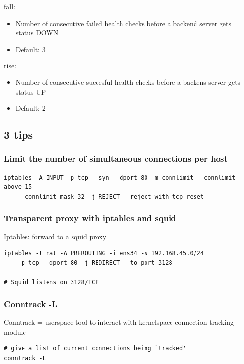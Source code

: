 \documentclass{article}
\begin{document}
fall:

\begin{itemize}
    \item Number of consecutive failed health checks before a backend server gets status DOWN
    \item Default: 3
\end{itemize}

rise:

\begin{itemize}
    \item Number of consecutive succesful health checks before a backens server gets status UP
    \item Default: 2
\end{itemize}

\subsection{3 tips}

\subsubsection{Limit the number of simultaneous connections per host}

\begin{verbatim}
iptables -A INPUT -p tcp --syn --dport 80 -m connlimit --connlimit-above 15 
    --connlimit-mask 32 -j REJECT --reject-with tcp-reset
\end{verbatim}

\subsubsection{Transparent proxy with iptables and squid}

Iptables: forward to a squid proxy

\begin{verbatim}
iptables -t nat -A PREROUTING -i ens34 -s 192.168.45.0/24 
    -p tcp --dport 80 -j REDIRECT --to-port 3128

# Squid listens on 3128/TCP
\end{verbatim}

\subsubsection{Conntrack -L}

Conntrack = userspace tool to interact with kernelspace connection tracking module

\begin{verbatim}
# give a list of current connections being `tracked'
conntrack -L
\end{verbatim}
\end{document}
